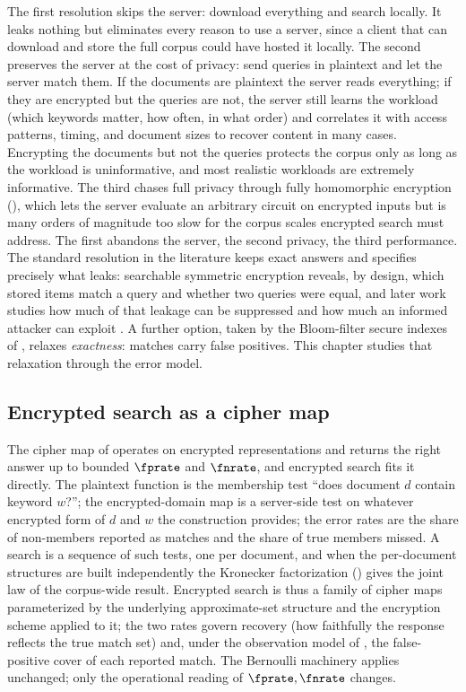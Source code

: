 The first resolution skips the server: download everything and search
locally. It leaks nothing but eliminates every reason to use a server,
since a client that can download and store the full corpus could have
hosted it locally. The second preserves the server at the cost of
privacy: send queries in plaintext and let the server match them. If the
documents are plaintext the server reads everything; if they are
encrypted but the queries are not, the server still learns the workload
(which keywords matter, how often, in what order) and correlates it with
access patterns, timing, and document sizes to recover content in many
cases. Encrypting the documents but not the queries protects the corpus
only as long as the workload is uninformative, and most realistic
workloads are extremely informative. The third chases full privacy
through fully homomorphic encryption
(), which lets the server evaluate an arbitrary
circuit on encrypted inputs but is many orders of magnitude too slow for
the corpus scales encrypted search must address. The first abandons the
server, the second privacy, the third performance. The standard
resolution in the literature keeps exact answers and specifies precisely
what leaks: searchable symmetric encryption
\parencite{song-wagner-perrig-2000,curtmola-et-al-2006} reveals, by
design, which stored items match a query and whether two queries were
equal, and later work studies how much of that leakage can be suppressed
\parencite{kamara-moataz-ohrimenko-2018} and how much an informed attacker
can exploit \parencite{cash-et-al-2015}. A further option, taken by the
Bloom-filter secure indexes of \textcite{goh-2003}, relaxes
\emph{exactness}: matches carry false positives. This chapter studies that
relaxation through the error model.

\subsection*{Encrypted search as a cipher map}

The cipher map of  operates on encrypted
representations and returns the right answer up to bounded $\fprate$ and
$\fnrate$, and encrypted search fits it directly. The plaintext function
is the membership test ``does document $d$ contain keyword $w$?''; the
encrypted-domain map is a server-side test on whatever encrypted form of
$d$ and $w$ the construction provides; the error rates are the share of
non-members reported as matches and the share of true members missed. A search is a sequence of such tests, one per document, and when the
per-document structures are built independently the Kronecker
factorization () gives the joint law of the
corpus-wide result. Encrypted search is thus a
family of cipher maps parameterized by the underlying approximate-set
structure and the encryption scheme applied to it; the two rates govern
recovery (how faithfully the response reflects the true match set) and,
under the observation model of ,
the false-positive cover of each reported match. The Bernoulli
machinery applies unchanged; only the operational reading of $\fprate,
\fnrate$ changes.

